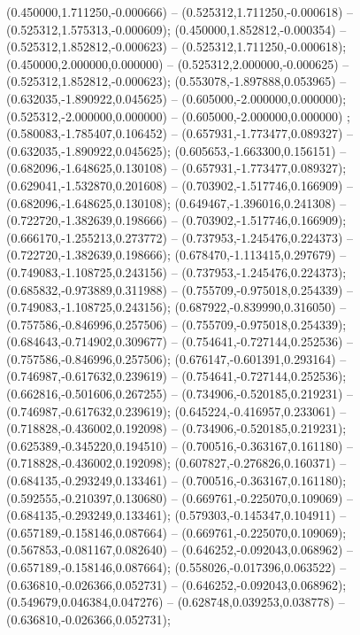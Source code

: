  (0.450000,1.711250,-0.000666) -- (0.525312,1.711250,-0.000618) -- (0.525312,1.575313,-0.000609);
 (0.450000,1.852812,-0.000354) -- (0.525312,1.852812,-0.000623) -- (0.525312,1.711250,-0.000618);
 (0.450000,2.000000,0.000000) -- (0.525312,2.000000,-0.000625) -- (0.525312,1.852812,-0.000623);
 (0.553078,-1.897888,0.053965) -- (0.632035,-1.890922,0.045625) -- (0.605000,-2.000000,0.000000);
 (0.525312,-2.000000,0.000000) -- (0.605000,-2.000000,0.000000) ;
 (0.580083,-1.785407,0.106452) -- (0.657931,-1.773477,0.089327) -- (0.632035,-1.890922,0.045625);
 (0.605653,-1.663300,0.156151) -- (0.682096,-1.648625,0.130108) -- (0.657931,-1.773477,0.089327);
 (0.629041,-1.532870,0.201608) -- (0.703902,-1.517746,0.166909) -- (0.682096,-1.648625,0.130108);
 (0.649467,-1.396016,0.241308) -- (0.722720,-1.382639,0.198666) -- (0.703902,-1.517746,0.166909);
 (0.666170,-1.255213,0.273772) -- (0.737953,-1.245476,0.224373) -- (0.722720,-1.382639,0.198666);
 (0.678470,-1.113415,0.297679) -- (0.749083,-1.108725,0.243156) -- (0.737953,-1.245476,0.224373);
 (0.685832,-0.973889,0.311988) -- (0.755709,-0.975018,0.254339) -- (0.749083,-1.108725,0.243156);
 (0.687922,-0.839990,0.316050) -- (0.757586,-0.846996,0.257506) -- (0.755709,-0.975018,0.254339);
 (0.684643,-0.714902,0.309677) -- (0.754641,-0.727144,0.252536) -- (0.757586,-0.846996,0.257506);
 (0.676147,-0.601391,0.293164) -- (0.746987,-0.617632,0.239619) -- (0.754641,-0.727144,0.252536);
 (0.662816,-0.501606,0.267255) -- (0.734906,-0.520185,0.219231) -- (0.746987,-0.617632,0.239619);
 (0.645224,-0.416957,0.233061) -- (0.718828,-0.436002,0.192098) -- (0.734906,-0.520185,0.219231);
 (0.625389,-0.345220,0.194510) -- (0.700516,-0.363167,0.161180) -- (0.718828,-0.436002,0.192098);
 (0.607827,-0.276826,0.160371) -- (0.684135,-0.293249,0.133461) -- (0.700516,-0.363167,0.161180);
 (0.592555,-0.210397,0.130680) -- (0.669761,-0.225070,0.109069) -- (0.684135,-0.293249,0.133461);
 (0.579303,-0.145347,0.104911) -- (0.657189,-0.158146,0.087664) -- (0.669761,-0.225070,0.109069);
 (0.567853,-0.081167,0.082640) -- (0.646252,-0.092043,0.068962) -- (0.657189,-0.158146,0.087664);
 (0.558026,-0.017396,0.063522) -- (0.636810,-0.026366,0.052731) -- (0.646252,-0.092043,0.068962);
 (0.549679,0.046384,0.047276) -- (0.628748,0.039253,0.038778) -- (0.636810,-0.026366,0.052731);
